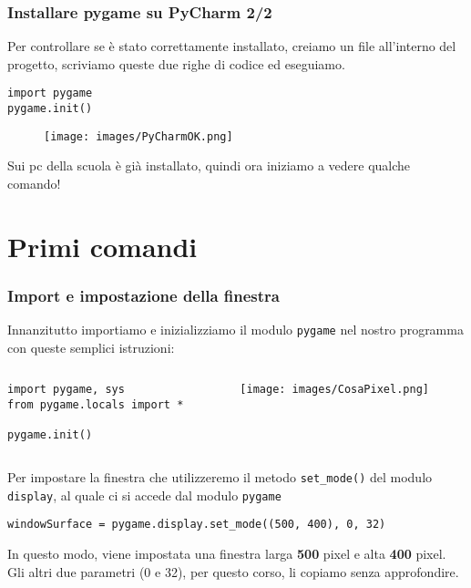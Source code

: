 \documentclass{beamer}
\begin{document}
\begin{frame}[fragile]
\frametitle{Installare pygame su PyCharm 2/2}

Per controllare se è stato correttamente installato, creiamo un file all'interno del progetto, scriviamo queste due righe di codice ed eseguiamo.
\begin{lstlisting}
import pygame
pygame.init()
		\end{lstlisting}
		\begin{figure}[t]
			\texttt{[image: images/PyCharmOK.png]}
		\end{figure}
Sui pc della scuola è già installato, quindi ora iniziamo a vedere qualche comando!

\end{frame}

\section{Primi comandi}

\begin{frame}[fragile]
\frametitle{Import e impostazione della finestra}
	Innanzitutto importiamo e inizializziamo il modulo \texttt{pygame} nel nostro programma con queste semplici istruzioni:
	\begin{columns}[T]
		\begin{column}[T]{0.55\textwidth}
	\begin{lstlisting}
import pygame, sys
from pygame.locals import *

pygame.init()
	\end{lstlisting}
		\end{column}
\begin{column}[T]{0.45\textwidth}
	\begin{figure}[t]
		\texttt{[image: images/CosaPixel.png]}
	\end{figure}
\end{column}
\end{columns}
	Per impostare la finestra che utilizzeremo il metodo \texttt{set\_mode()} del modulo \texttt{display}, al quale ci si accede dal modulo \texttt{pygame}
\begin{lstlisting}
windowSurface = pygame.display.set_mode((500, 400), 0, 32)
\end{lstlisting}
In questo modo, viene impostata una finestra larga \textbf{500} pixel e alta \textbf{400} pixel. Gli altri due parametri (0 e 32), per questo corso, li copiamo senza approfondire.
\end{frame}
\end{document}
